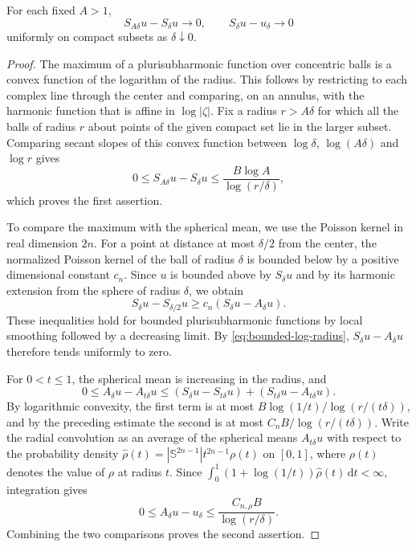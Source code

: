 \begin{lemma}\label{lem:bounded-local-regularization}
For each fixed $A>1$,
\[
 S_{A\delta}u-S_\delta u\longrightarrow0,
 \qquad S_\delta u-u_\delta\longrightarrow0
\]
uniformly on compact subsets as $\delta\downarrow0$.
\end{lemma}
\begin{proof}
The maximum of a plurisubharmonic function over concentric balls is a convex function of the logarithm of the radius. This follows by restricting to each complex line through the center and comparing, on an annulus, with the harmonic function that is affine in $\log|\zeta|$. Fix a radius $r>A\delta$ for which all the balls of radius $r$ about points of the given compact set lie in the larger subset. Comparing secant slopes of this convex function between $\log\delta$, $\log(A\delta)$ and $\log r$ gives
\begin{equation}\label{eq:bounded-log-radius}
 0\leq S_{A\delta}u-S_\delta u
 \leq\frac{B\log A}{\log(r/\delta)},
\end{equation}
which proves the first assertion.

To compare the maximum with the spherical mean, we use the Poisson kernel in real dimension $2n$. For a point at distance at most $\delta/2$ from the center, the normalized Poisson kernel of the ball of radius $\delta$ is bounded below by a positive dimensional constant $c_n$. Since $u$ is bounded above by $S_\delta u$ and by its harmonic extension from the sphere of radius $\delta$, we obtain
\[
 S_\delta u-S_{\delta/2}u
 \geq c_n(S_\delta u-A_\delta u).
\]
These inequalities hold for bounded plurisubharmonic functions by local smoothing followed by a decreasing limit. By \eqref{eq:bounded-log-radius}, $S_\delta u-A_\delta u$ therefore tends uniformly to zero.

For $0<t\leq1$, the spherical mean is increasing in the radius, and
\[
 0\leq A_\delta u-A_{t\delta}u
 \leq (S_\delta u-S_{t\delta}u)
                +(S_{t\delta}u-A_{t\delta}u).
\]
By logarithmic convexity, the first term is at most
$B\log(1/t)/\log(r/(t\delta))$, and by the preceding estimate the second is at most $C_nB/\log(r/(t\delta))$. Write the radial convolution as an average of the spherical means $A_{t\delta}u$ with respect to the probability density
$\widehat\rho(t)=|\mathbb S^{2n-1}|t^{2n-1}\rho(t)$ on $[0,1]$, where $\rho(t)$ denotes the value of $\rho$ at radius $t$. Since
$\int_0^1(1+\log(1/t))\widehat\rho(t)\,\mathrm{d}t<\infty$, integration gives
\[
 0\leq A_\delta u-u_\delta
 \leq\frac{C_{n,\rho}B}{\log(r/\delta)}.
\]
Combining the two comparisons proves the second assertion.
\end{proof}

